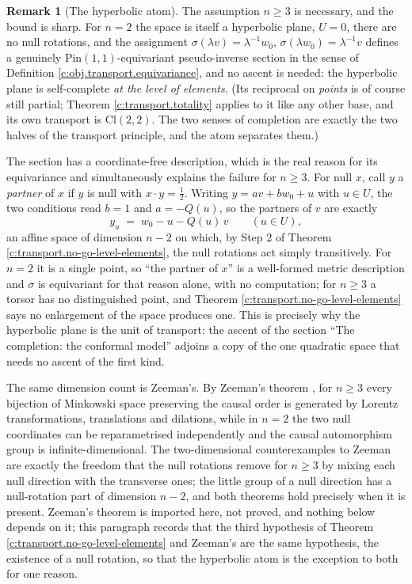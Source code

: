 \documentclass[11pt]{article}
\theoremstyle{definition}
\newtheorem{remark}[theorem]{Remark}
\theoremstyle{plain}
\providecommand{\Cl}{}\renewcommand{\Cl}{\mathrm{Cl}}
\providecommand{\Pin}{}\renewcommand{\Pin}{\mathrm{Pin}}
\begin{document}
\begin{remark}[The hyperbolic atom]\label{c:note.transport.hyperbolic-atom}
The assumption $n \geq 3$ is necessary, and the bound is sharp. For $n = 2$ the space is itself a hyperbolic plane, $U = 0$, there are no null rotations, and the assignment $\sigma(\lambda v) = \lambda^{-1} w_0$, $\sigma(\lambda w_0) = \lambda^{-1} v$ defines a genuinely $\Pin(1,1)$-equivariant pseudo-inverse section in the sense of Definition \ref{c:obj.transport.equivariance}, and no ascent is needed: the hyperbolic plane is self-complete \emph{at the level of elements}. (Its reciprocal on \emph{points} is of course still partial; Theorem \ref{c:transport.totality} applies to it like any other base, and its own transport is $\Cl(2,2)$. The two senses of completion are exactly the two halves of the transport principle, and the atom separates them.)

The section has a coordinate-free description, which is the real reason for its equivariance and simultaneously explains the failure for $n \geq 3$. For null $x$, call $y$ a \emph{partner} of $x$ if $y$ is null with $x \cdot y = \tfrac12$. Writing $y = av + bw_0 + u$ with $u \in U$, the two conditions read $b = 1$ and $a = -Q(u)$, so the partners of $v$ are exactly
\begin{equation}
y_u \;=\; w_0 - u - Q(u)\,v \qquad (u \in U),
\end{equation}
an affine space of dimension $n - 2$ on which, by Step 2 of Theorem \ref{c:transport.no-go-level-elements}, the null rotations act simply transitively. For $n = 2$ it is a single point, so ``the partner of $x$'' is a well-formed metric description and $\sigma$ is equivariant for that reason alone, with no computation; for $n \geq 3$ a torsor has no distinguished point, and Theorem \ref{c:transport.no-go-level-elements} says no enlargement of the space produces one. This is precisely why the hyperbolic plane is the unit of transport: the ascent of the section ``The completion: the conformal model'' adjoins a copy of the one quadratic space that needs no ascent of the first kind.


The same dimension count is Zeeman's. By Zeeman's theorem \cite{Zeeman1964}, for $n \geq 3$ every bijection of Minkowski space preserving the causal order is generated by Lorentz transformations, translations and dilations, while in $n = 2$ the two null coordinates can be reparametrised independently and the causal automorphism group is infinite-dimensional. The two-dimensional counterexamples to Zeeman are exactly the freedom that the null rotations remove for $n \geq 3$ by mixing each null direction with the transverse ones; the little group of a null direction has a null-rotation part of dimension $n - 2$, and both theorems hold precisely when it is present. Zeeman's theorem is imported here, not proved, and nothing below depends on it; this paragraph records that the third hypothesis of Theorem \ref{c:transport.no-go-level-elements} and Zeeman's are the same hypothesis, the existence of a null rotation, so that the hyperbolic atom is the exception to both for one reason.
\end{remark}
\end{document}
